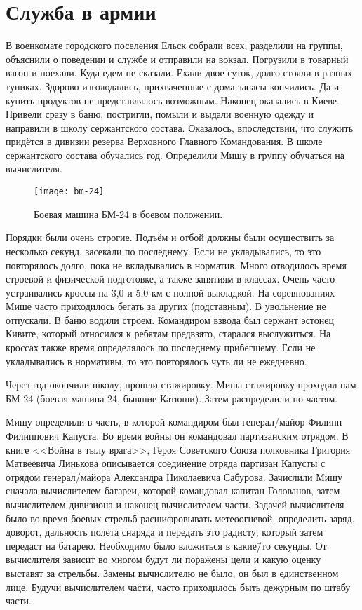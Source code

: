﻿\chapter{Служба в армии}
В военкомате городского поселения Ельск собрали всех, разделили на группы, объяснили о поведении и службе и отправили на вокзал. Погрузили в товарный вагон и поехали. Куда едем не сказали. Ехали двое суток, долго стояли в разных тупиках. Здорово изголодались, прихваченные с дома запасы кончились. Да и купить продуктов не представлялось возможным. Наконец оказались в Киеве. Привели сразу в баню, постригли, помыли и выдали военную одежду и направили в школу сержантского состава. Оказалось, впоследствии, что служить придётся в дивизии резерва Верховного Главного Командования. В школе сержантского состава обучались год. Определили Мишу в группу обучаться на вычислителя.

\begin{wrapfigure}{O}{.4\textwidth}
\centering
\texttt{[image: bm-24]}
\caption[Боевая машина БМ-24 в боевом положении.]{Боевая машина БМ-24 в боевом положении\footnotemark.}
\label{fig:bm-24}
\end{wrapfigure}

Порядки были очень строгие. Подъём и отбой должны были осуществить за несколько секунд, засекали по последнему. Если не укладывались, то это повторялось долго, пока не вкладывались в норматив. Много отводилось время строевой и физической подготовке, а также занятиям в классах. Очень часто устраивались кроссы на 3,0 и 5,0 км с полной выкладкой. На соревнованиях Мише часто приходилось бегать за других (подставным). В увольнение не отпускали. В баню водили строем. Командиром взвода был сержант эстонец Кивите, который относился к ребятам предвзято, старался выслужиться. На кроссах также время определялось по последнему прибегшему. Если не укладывались в нормативы, то это повторялось чуть ли не ежедневно. 

Через год окончили школу, прошли стажировку. Миша стажировку проходил нам БМ-24 (боевая машина 24, бывшие Катюши). Затем распределили по частям. 

Мишу определили в часть, в которой командиром был генерал\-/майор Филипп Филиппович Капуста. Во время войны он командовал партизанским отрядом. В книге <<Война в тылу врага>>, Героя Советского Союза полковника Григория Матвеевича Линькова описывается соединение отряда партизан Капусты с отрядом генерал\-/майора Александра Николаевича Сабурова. Зачислили Мишу сначала вычислителем батареи, которой командовал капитан Голованов, затем вычислителем дивизиона и наконец вычислителем части. Задачей вычислителя было во время боевых стрельб расшифровывать метеоогневой, определить заряд, доворот, дальность полёта снаряда и передать это радисту, который затем передаст на батарею. Необходимо было вложиться в какие\=/то секунды. От вычислителя зависит во многом будут ли поражены цели и какую оценку выставят за стрельбы. Замены вычислителю не было, он был в единственном лице. Будучи вычислителем части, часто приходилось быть дежурным по штабу части. 

